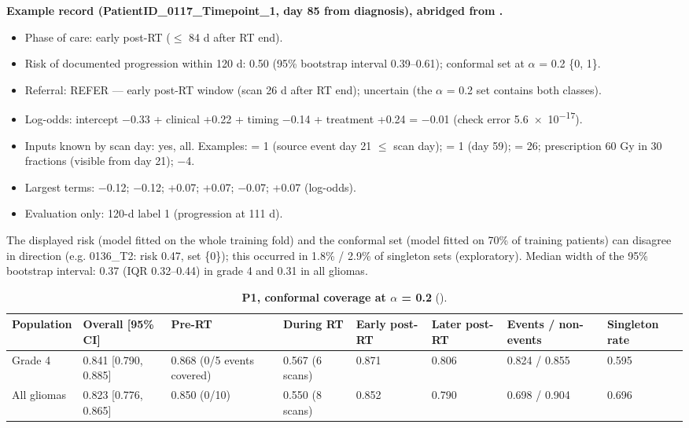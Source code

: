 \documentclass[11pt,a4paper]{article}
\begin{document}
\textbf{Example record (PatientID\_0117\_Timepoint\_1, day 85 from diagnosis), abridged from
.}

\begin{itemize}
\item Phase of care: early post-RT ($\leq$ 84 d after RT end).
\item Risk of documented progression within 120 d: 0.50 (95\% bootstrap interval 0.39--0.61); conformal set at
$\alpha$ = 0.2 \{0, 1\}.
\item Referral: REFER --- early post-RT window (scan 26 d after RT end); uncertain (the $\alpha$ = 0.2 set
contains both classes).
\item Log-odds: intercept $-$0.33 + clinical +0.22 + timing $-$0.14 + treatment +0.24 = $-$0.01 (check error
\num{5.6e-17}).
\item Inputs known by scan day: yes, all. Examples:  = 1 (source event day 21 $\leq$ scan
day);  = 1 (day 59);
 = 26; prescription 60 Gy in 30 fractions
(visible from day 21);  $-$4.
\item Largest terms:  $-$0.12;  $-$0.12;
 +0.07;  +0.07; 
$-$0.07;  +0.07
(log-odds).
\item Evaluation only: 120-d label 1 (progression at 111 d).
\end{itemize}

The displayed risk (model fitted on the whole training fold) and the conformal set (model fitted on 70\% of
training patients) can disagree in direction (e.g. 0136\_T2: risk 0.47, set \{0\}); this occurred in 1.8\% /
2.9\% of singleton sets (exploratory). Median width of the 95\% bootstrap interval: 0.37 (IQR 0.32--0.44) in
grade 4 and 0.31 in all gliomas.

\begin{table}[H]
\centering
\footnotesize
\renewcommand{\thetable}{S21}\renewcommand{\theHtable}{S21}
\caption{\textbf{P1, conformal coverage at $\alpha$ = 0.2} ().}
\label{tab:S21}
\begin{tabularx}{\linewidth}{@{}R{1.6cm} R{2.9cm} L R{1.5cm} R{1.3cm} R{1.3cm} R{1.6cm} R{1.3cm}@{}}
\toprule
Population & Overall [95\% CI] & Pre-RT & During RT & Early post-RT & Later post-RT & Events / non-events & Singleton rate \\
\midrule
Grade 4 & 0.841 [0.790, 0.885] & 0.868 (0/5 events covered) & 0.567 (6 scans) & 0.871 & 0.806 & 0.824 / 0.855 & 0.595 \\
All gliomas & 0.823 [0.776, 0.865] & 0.850 (0/10) & 0.550 (8 scans) & 0.852 & 0.790 & 0.698 / 0.904 & 0.696 \\
\bottomrule
\end{tabularx}
\end{table}
\end{document}
